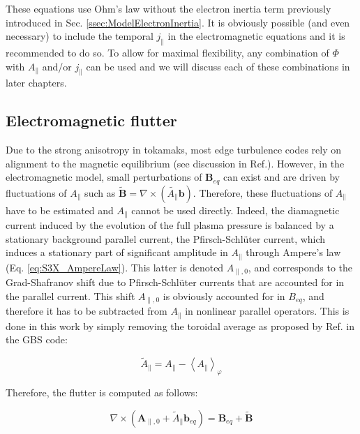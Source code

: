 These equations use Ohm's law without the electron inertia term previously introduced in Sec. \ref{ssec:ModelElectronInertia}. It is obviously possible (and even necessary) to include the temporal  $j_\parallel$ in the electromagnetic equations and it is recommended to do so. To allow for maximal flexibility, any combination of $\Phi$ with $A_\parallel$ and/or $j_\parallel$ can be used and we will discuss each of these combinations in later chapters.




\subsection{Electromagnetic flutter}
\label{ssec:S3X_flutter}
Due to the strong anisotropy in tokamaks, most edge turbulence codes rely on alignment to the magnetic equilibrium (see discussion in Ref.\cite{SCHWANDER_2024}). However, in the electromagnetic model, small perturbations of $\mathbf{B}_{eq}$ can exist and are driven by fluctuations of $A_\parallel$ such as $\tilde{\mathbf{B}} = \nabla \times (\tilde{A_\parallel} \mathbf{b})$. Therefore, these fluctuations of $A_\parallel$ have to be estimated and $A_\parallel$ cannot be used directly. Indeed, the diamagnetic current induced by the evolution of the full plasma pressure is balanced by a stationary background parallel current, the Pfirsch-Schlüter current, which induces a stationary part of significant amplitude in $A_\parallel$ through Ampere's law (Eq. \ref{eq:S3X_AmpereLaw}). This latter is denoted $A_{\parallel,0}$, and corresponds to the Grad-Shafranov shift due to Pfirsch-Schlüter currents that are accounted for in the parallel current. This shift $A_{\parallel,0}$ is obviously accounted for in $B_{eq}$, and therefore it has to be subtracted from $A_\parallel$ in nonlinear parallel operators. This is done in this work by simply removing the toroidal average as proposed by Ref.\cite{giacomin2022gbs} in the GBS code: \newline

\begin{equation}
	\tilde{A}_\parallel = A_\parallel - \left<A_\parallel\right>_\varphi \label{eq:averagedAParallel}
\end{equation}

Therefore, the flutter is computed as follows: \newline

\begin{equation}
	\nabla \times \left( \mathbf{A}_{\parallel,0} + \tilde{A}_\parallel \mathbf{b}_{eq} \right) = \mathbf{B}_{eq} + \tilde{\mathbf{B}} 
	\label{eq:definitionMagneticFieldWithFlutter}
\end{equation}

